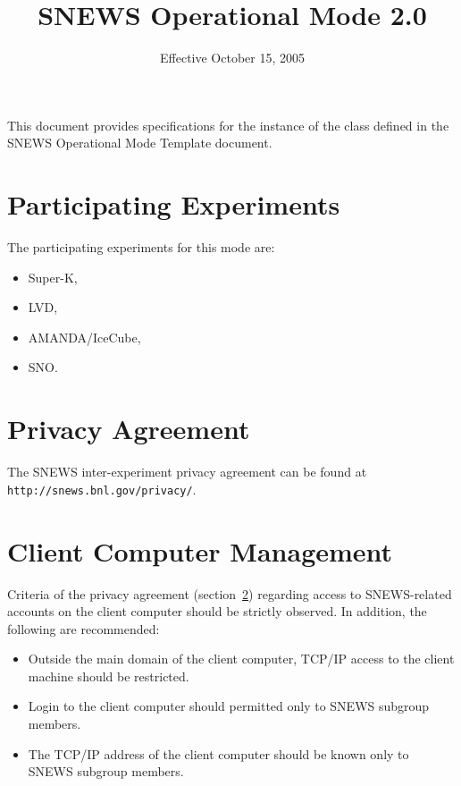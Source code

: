 \documentclass{article}
\begin{document}
\title{SNEWS Operational Mode 2.0}         
\date{Effective October 15, 2005}
\maketitle

This document provides specifications for the instance of
the class defined in the SNEWS Operational Mode Template document.

\section{Participating Experiments}

The participating experiments for this mode are:

\begin{itemize}
\item Super-K,
\item LVD,
\item AMANDA/IceCube,
\item SNO.
\end{itemize}

\section{Privacy Agreement}\label{privacy}

The SNEWS inter-experiment privacy agreement can be found at \\
{\tt http://snews.bnl.gov/privacy/}.

\section{Client Computer Management}

Criteria of the privacy agreement (section~\ref{privacy}) regarding
access to SNEWS-related accounts on the client computer should be
strictly observed. In addition, the following are recommended:

\begin{itemize}
\item Outside the main domain of the 
client computer, TCP/IP access to the client machine should be restricted.
\item Login to the client computer should permitted only to SNEWS subgroup 
members.
\item The TCP/IP address of the client computer should be known only to 
SNEWS subgroup members.
\end{itemize}
\end{document}
